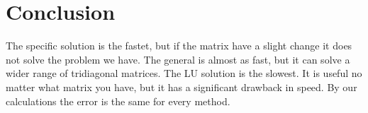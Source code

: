 \documentclass[12pt,norsk,a4paper]{article}
\begin{document}
\section{Conclusion}
The specific solution is the fastet, but if the matrix have a slight change it does not solve the problem we have. The general is almost as fast, but it can solve a wider range of tridiagonal matrices. The LU solution is the slowest. It is useful no matter what matrix you have, but it has a significant drawback in speed. By our calculations the error is the same for every method. 




















\end{document}
